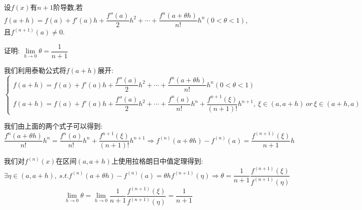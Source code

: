 
\begin{proposition}
	设$f(x)$有$n+1$阶导数,若$f(a+h)=f(a)+f'(a)h+\dfrac{f''(a)}{2}h^2+\cdots+\dfrac{f^{n}(a+\theta h)}{n!}h^n(0<\theta<1)$,且$f^{(n+1)}(a)\neq 0$.

	证明: $\lim\limits_{h\rightarrow 0 }\theta=\dfrac{1}{n+1}$
\end{proposition}
\begin{solution}

	我们利用泰勒公式将$f(a+h)$展开:
	$$\left\lbrace
		\begin{array}{l}
			f(a+h)=f(a)+f'(a)h+\dfrac{f''(a)}{2}h^2+\cdots+\dfrac{f^{n}(a+\theta h)}{n!}h^n(0<\theta<1) \\
			f(a+h)=f(a)+f'(a)h+\dfrac{f''(a)}{2}h^2+\cdots+\dfrac{f^{n}(a)}{n!}h^n+\dfrac{f^{n+1}(\xi)}{(n+1)!}h^{n+1},\ \xi\in(a,a+h)\ or\ \xi\in(a+h,a)
		\end{array}
		\right.$$

	我们由上面的两个式子可以得到:
	$$\dfrac{f^{n}(a+\theta h)}{n!}h^n=\dfrac{f^{n}(a)}{n!}h^n+\dfrac{f^{n+1}(\xi)}{(n+1)!}h^{n+1}\Rightarrow f^{(n)}(a+\theta h)-f^{(n)}(a)=\dfrac{f^{(n+1)}(\xi)}{n+1}h$$

	我们对$f^{(n)}(x)$在区间$(a,a+h)$上使用拉格朗日中值定理得到:
	$$\exists\eta\in(a,a+h),\ s.t. f^{(n)}(a+\theta h)-f^{(n)}(a)=\theta hf^{(n+1)}(\eta)\Rightarrow \theta=\dfrac{1}{n+1}\dfrac{f^{(n+1)}(\xi)}{f^{(n+1)}(\eta)}$$
	$$\lim\limits_{h\rightarrow 0 }\theta=\lim\limits_{h\rightarrow 0 }\dfrac{1}{n+1}\dfrac{f^{(n+1)}(\xi)}{f^{(n+1)}(\eta)}=\dfrac{1}{n+1}$$

\end{solution}


